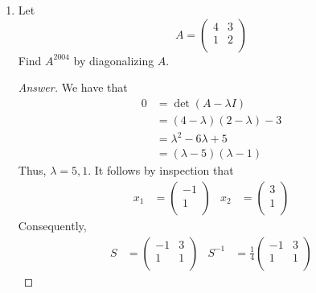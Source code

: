 \documentclass[../psets.tex]{subfiles}
\begin{document}
\begin{enumerate}[label={\textbf{2.\arabic*.}}]
\begin{proof}[Answer]
\begin{equation*}
            = \lambda\ab-i\lambda\bb
            = \lambda(\ab-i\bb)
            = \lambda\bar{\vm}
        \end{equation*}
        as desired.
    \end{proof}
    \item Let
    \begin{equation*}
        A =
        \begin{pmatrix}
            4 & 3\\
            1 & 2\\
        \end{pmatrix}
    \end{equation*}
    Find $A^{2004}$ by diagonalizing $A$.
    \begin{proof}[Answer]
        We have that
        \begin{align*}
            0 &= \det(A-\lambda I)\\
            &= (4-\lambda)(2-\lambda)-3\\
            &= \lambda^2-6\lambda+5\\
            &= (\lambda-5)(\lambda-1)
        \end{align*}
        Thus, $\lambda=5,1$. It follows by inspection that
        \begin{align*}
            x_1 &=
            \begin{pmatrix}
                -1\\
                1\\
            \end{pmatrix}&
            x_2 &=
            \begin{pmatrix}
                3\\
                1\\
            \end{pmatrix}
        \end{align*}
        Consequently,
        \begin{align*}
            S &=
            \begin{pmatrix}
                -1 & 3\\
                1 & 1\\
            \end{pmatrix}&
            S^{-1} &= \frac{1}{4}
            \begin{pmatrix}
                -1 & 3\\
                1 & 1\\
            \end{pmatrix}
        \end{align*}

\end{proof}
\end{enumerate}
\end{document}
